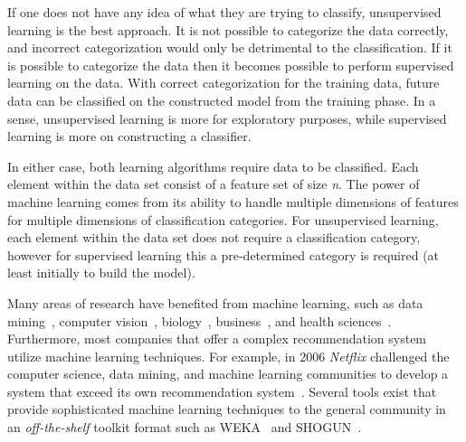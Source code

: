 If one does not have any idea of what they are trying to classify, unsupervised learning is the best approach. It is not possible to categorize the data correctly, and incorrect categorization would only be detrimental to the classification. If it is possible to categorize the data then it becomes possible to perform supervised learning on the data. With correct categorization for the training data, future data can be classified on the constructed model from the training phase. In a sense, unsupervised learning is more for exploratory purposes, while supervised learning is more on constructing a classifier.

In either case, both learning algorithms require data to be classified. Each element within the data set consist of a feature set of size \emph{n}. The power of machine learning comes from its ability to handle multiple dimensions of features for multiple dimensions of classification categories. For unsupervised learning, each element within the data set does not require a classification category, however for supervised learning this a pre-determined category is required (at least initially to build the model).

Many areas of research have benefited from machine learning, such as data mining~\cite{WFH11}, computer vision~\cite{Her03}, biology~\cite{OLP08}, business~\cite{Her00}, and health sciences~\cite{Kon01}. Furthermore, most companies that offer a complex recommendation system utilize machine learning techniques. For example, in 2006 \emph{Netflix} challenged the computer science, data mining, and machine learning communities to develop a system that exceed its own recommendation system~\cite{BL07}. Several tools exist that provide sophisticated machine learning techniques to the general community in an \emph{off-the-shelf} toolkit format such as WEKA~\cite{HFH+09} and SHOGUN~\cite{SRH+10}.


